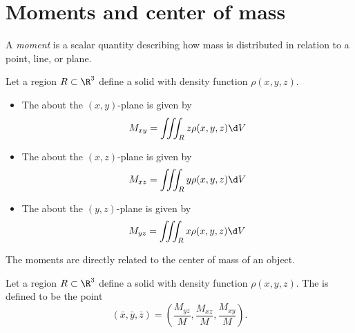 \documentclass{ximera}
\begin{document}
\section{Moments and center of mass}

A \textit{moment} is a scalar quantity describing how mass is distributed
in relation to a point, line, or plane.

\begin{definition}
  Let a region $R\subset\R^3$ define a solid with density function $\rho(x,y,z)$.
  \begin{itemize}
  \item The  about the $(x,y)$-plane is given by
    \[
    M_{xy} = \iiint_R z \rho(x,y,z) \d V
    \]
  \item The  about the $(x,z)$-plane is given by
    \[
    M_{xz} = \iiint_R y \rho(x,y,z) \d V
    \]
  \item The  about the $(y,z)$-plane is given by
    \[
    M_{yz} = \iiint_R x \rho(x,y,z) \d V
    \]
  \end{itemize}
\end{definition}

The moments are directly related to the center of mass of an object.

\begin{definition}
  Let a region $R\subset\R^3$ define a solid with density function $\rho(x,y,z)$.
  The  is defined to be the point
  \[
  (\bar{x},\bar{y},\bar{z}) = \left(\frac{M_{yz}}{M},\frac{M_{xz}}{M},\frac{M_{xy}}{M}\right).
  \]
\end{definition}
\end{document}
